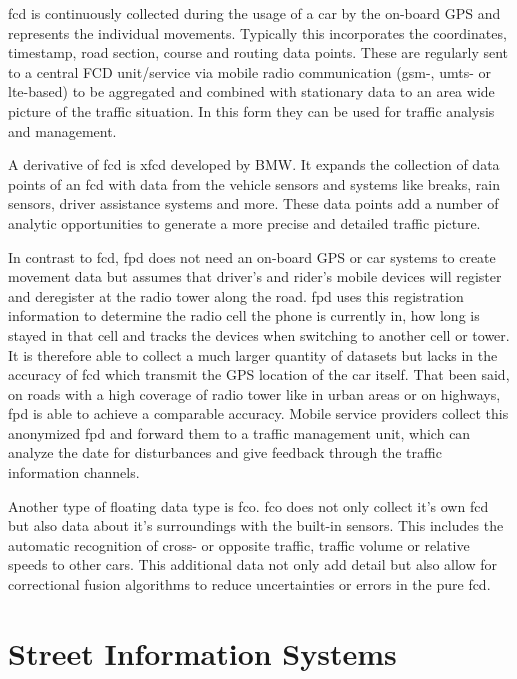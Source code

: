 \acrfull{fcd} is continuously collected during the usage of a car by the on-board GPS and represents the individual movements. Typically this incorporates the coordinates, timestamp, road section, course and routing data points. These are regularly sent to a central FCD unit/service via mobile radio communication (\acrshort{gsm}-, \acrshort{umts}- or \acrshort{lte}-based) to be aggregated and combined with stationary data to an area wide picture of the traffic situation. In this form they can be used for traffic analysis and management. \parencite{Randelhoff2016,LAPID2020}

A derivative of \acrshort{fcd} is \acrfull{xfcd} developed by BMW. It expands the collection of data points of an \acrshort{fcd} with data from the vehicle sensors and systems like breaks, rain sensors, driver assistance systems and more. These data points add a number of analytic opportunities to generate a more precise and detailed traffic picture. \parencite{LAPID2020}

In contrast to \acrshort{fcd}, \acrlong{fpd} does not need an on-board GPS or car systems to create movement data but assumes that driver’s and rider’s mobile devices will register and deregister at the radio tower along the road. \acrshort{fpd} uses this registration information to determine the radio cell the phone is currently in, how long is stayed in that cell and tracks the devices when switching to another cell or tower. It is therefore able to collect a much larger quantity of datasets but lacks in the accuracy of \acrshort{fcd} which transmit the GPS location of the car itself. That been said, on roads with a high coverage of radio tower like in urban areas or on highways, \acrshort{fpd} is able to achieve a comparable accuracy. Mobile service providers collect this anonymized \acrshort{fpd} and forward them to a traffic management unit, which can analyze the date for disturbances and give feedback through the traffic information channels. \parencite{Randelhoff2016,LAPID2020}

Another type of floating data type is \acrfull{fco}. \acrshort{fco} does not only collect it's own \acrshort{fcd} but also data about it's surroundings with the built-in sensors. This includes the automatic recognition of cross- or opposite traffic, traffic volume or relative speeds to other cars. This additional data not only add detail but also allow for correctional fusion algorithms to reduce uncertainties or errors in the pure \acrshort{fcd}. \parencite{Randelhoff2016}

\section{Street Information Systems}

